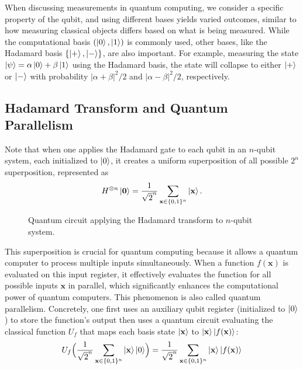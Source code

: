 \documentclass[cryptography,review,submit,pdftex,moreauthors,amsmath,amssymb,aps,strict]{Definitions/mdpi}
\begin{document}
When discussing measurements in quantum computing, we consider a specific property of the qubit, and using different bases yields varied outcomes, similar to how measuring classical objects differs based on what is being measured. While the computational basis $(\ket{0},\ket{1})$ is commonly used, other bases, like the Hadamard basis $\{\ket{+},\ket{-}\}$, are also important. For example, measuring the state $\ket{\psi}=\alpha\ket{0}+\beta\ket{1}$ using the Hadamard basis, the state will collapse to either $\ket{+}$ or $\ket{-}$ with probability $|\alpha+\beta|^2/2$ and $|\alpha-\beta|^2/2$, respectively. 

\subsection{Hadamard Transform and Quantum Parallelism}
Note that when one applies the Hadamard gate to each qubit in an $n$-qubit system, each initialized to $\ket{0}$, it creates a uniform superposition of all possible  $2^n$ superposition, represented as  
\begin{align}
    H^{\otimes n}\ket{\mathbf{0}}=\frac{1}{\sqrt{2}^n}\sum_{\mathbf{x}\in\{0,1\}^n}\ket{\mathbf{x}}.
\end{align}

\begin{figure}[!htbp]
    \center
    
    \caption{Quantum circuit applying the Hadamard transform to $n$-qubit system.}
    \label{fig:fig:hadamard-transform}
\end{figure}

This superposition is crucial for quantum computing because it allows a quantum computer to process multiple inputs simultaneously. When a function $f(\mathbf{x})$ is evaluated on this input register, it effectively evaluates the function for all possible inputs $\mathbf{x}$ in parallel, which significantly enhances the computational power of quantum computers. This phenomenon is also called quantum parallelism. Concretely, one first uses an auxiliary qubit register (initialized to $\ket{0}$) to store the function's output then uses a quantum circuit evaluating the classical function $U_f$ that maps each basis state $\ket{\mathbf{x}}$ to $\ket{\mathbf{x}}\ket{f(\mathbf{x})}$:
\begin{align}
U_f\Bigl(\frac{1}{\sqrt{2}^n}\sum_{\mathbf{x}\in\{0,1\}^n}\ket{\mathbf{x}}\ket{0}\Bigr) = \frac{1}{\sqrt{2}^n}\sum_{\mathbf{x}\in\{0,1\}^n}\ket{\mathbf{x}}\ket{f(\mathbf{x})}
\end{align}
\end{document}
